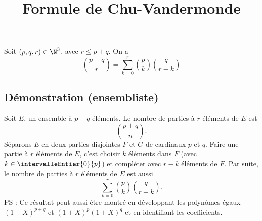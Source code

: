 \documentclass[fontsize=12pt,twoside=false,parskip=half]{scrartcl}
\title{Formule de Chu-Vandermonde}
\date{}
\author{}
\begin{document}
\maketitle
   \begin{Theoreme}
      Soit $(p, q, r) \in \N^3$, avec $r \leq p + q$. On a
      \[
         \binom{p + q}{r} = \sum_{k = 0}^r \binom{p}{k} \binom{q}{r - k}
      \]
   \end{Theoreme}
   \subsection{Démonstration (ensembliste)}
      Soit $E$, un ensemble à $p + q$ éléments. Le nombre de parties à $r$ éléments de $E$ est
      \[
         \binom{p + q}{n}.
      \]
      Séparons $E$ en deux parties disjointes $F$ et $G$ de cardinaux $p$ et $q$. Faire une partie à $r$ 
      éléments de $E$, c’est choisir $k$ éléments dans $F$ (avec $k \in \intervalleEntier{0}{p}$) et compléter
      avec $r - k$ éléments de $F$. Par suite, le nombre de parties à $r$ éléments de $E$ est aussi
      \[
         \sum_{k = 0}^r \binom{p}{k} \binom{q}{r - k}.
      \]     
      PS : Ce résultat peut aussi être montré en développant les polynômes égaux
      $(1 + X)^{p + q}$ et $(1 + X)^p(1 + X)^q$ et en identifiant les coefficients.
\end{document}
